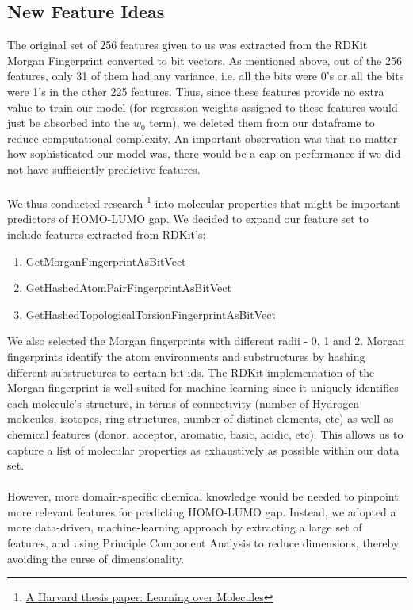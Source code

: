 \documentclass[letterpaper]{article}
\begin{document}
\subsection{New Feature Ideas}
The original set of 256 features given to us was extracted from the RDKit Morgan Fingerprint converted to bit vectors. As mentioned above, out of the 256 features, only 31 of them had any variance, i.e. all the bits were 0's or all the bits were 1's in the other 225 features. Thus, since these features provide no extra value to train our model (for regression weights assigned to these features would just be absorbed into the $w_0$ term), we deleted them from our dataframe to reduce computational complexity. An important observation was that no matter how sophisticated our model was, there would be a cap on performance if we did not have sufficiently predictive features.\\
\\
We thus conducted research \footnote{\href{http://dash.harvard.edu/bitstream/handle/1/12705171/Sun\%20thesis.pdf?sequence=1}{A Harvard thesis paper: Learning over Molecules}} into molecular properties that might be important predictors of HOMO-LUMO gap. We decided to expand our feature set to include features extracted from RDKit's:
\begin{enumerate}
\item GetMorganFingerprintAsBitVect
\item GetHashedAtomPairFingerprintAsBitVect
\item GetHashedTopologicalTorsionFingerprintAsBitVect
\end{enumerate}
We also selected the Morgan fingerprints with different radii - 0, 1 and 2. Morgan fingerprints identify the atom environments and substructures by hashing different substructures to certain bit ids. The RDKit implementation of the Morgan fingerprint is well-suited for machine learning since it uniquely identifies each molecule's structure, in terms of connectivity (number of Hydrogen molecules, isotopes, ring structures, number of distinct elements, etc) as well as chemical features (donor, acceptor, aromatic, basic, acidic, etc). This allows us to capture a list of molecular properties as exhaustively as possible within our data set.\\
\\
However, more domain-specific chemical knowledge would be needed to pinpoint more relevant features for predicting HOMO-LUMO gap. Instead, we adopted a more data-driven, machine-learning approach by extracting a large set of features, and using Principle Component Analysis to reduce dimensions, thereby avoiding the curse of dimensionality. 
\end{document}
